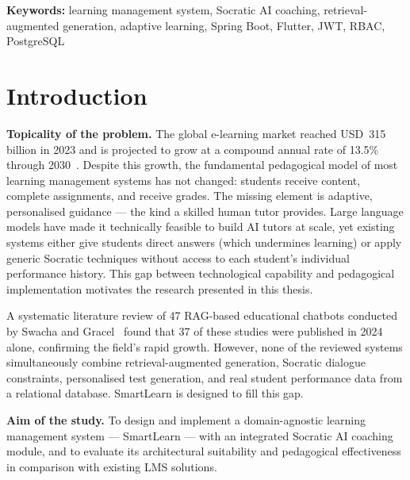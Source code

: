 \documentclass[12pt,a4paper]{report}
\begin{document}
\vspace{1.5em}
\par
{}
\vspace{0.4em}
\noindent\textbf{Keywords:} learning management system, Socratic AI coaching,
retrieval-augmented generation, adaptive learning, Spring Boot, Flutter, JWT, RBAC,
PostgreSQL

\tableofcontents

\listoffigures
\listoftables

\chapter*{Introduction}

\noindent\textbf{Topicality of the problem.} The global e-learning market reached
USD~315 billion in 2023 and is projected to grow at a compound annual rate of 13.5\%
through 2030~\cite{ref1}. Despite this growth, the fundamental pedagogical model of
most learning management systems has not changed: students receive content, complete
assignments, and receive grades. The missing element is adaptive, personalised
guidance --- the kind a skilled human tutor provides. Large language models have made
it technically feasible to build AI tutors at scale, yet existing systems either give
students direct answers (which undermines learning) or apply generic Socratic
techniques without access to each student's individual performance history. This gap
between technological capability and pedagogical implementation motivates the
research presented in this thesis.

A systematic literature review of 47 RAG-based educational chatbots conducted by
Swacha and Gracel~\cite{ref12} found that 37 of these studies were published in 2024
alone, confirming the field's rapid growth. However, none of the reviewed systems
simultaneously combine retrieval-augmented generation, Socratic dialogue constraints,
personalised test generation, and real student performance data from a relational
database. SmartLearn is designed to fill this gap.

\noindent\textbf{Aim of the study.} To design and implement a domain-agnostic
learning management system --- SmartLearn --- with an integrated Socratic AI coaching
module, and to evaluate its architectural suitability and pedagogical effectiveness in
comparison with existing LMS solutions.
\end{document}
